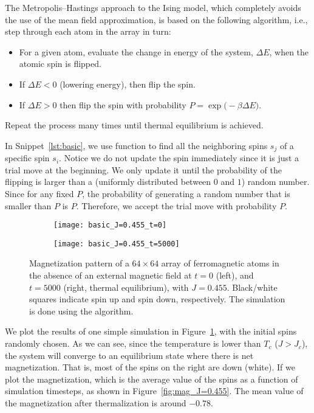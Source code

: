 The Metropolis--Hastings approach to the Ising model, which completely avoids the use of the mean
field approximation, is based on the following algorithm, i.e.,
step through each atom in the array in turn:
%
\begin{itemize}
    \item For a given atom, evaluate the change in energy of the system, \(\Delta E\), when
          the atomic spin is flipped.
    \item If \(\Delta E < 0\) (lowering energy), then flip the spin.
    \item If \(\Delta E > 0\) then flip the spin with probability
          \(P=\exp\bigl(-\beta \Delta E\bigr)\).
\end{itemize}
%
Repeat the process many times until thermal equilibrium is achieved.

In Snippet~\ref{lst:basic}, we use function  to find all the neighboring
spins \(s_j\) of a specific spin \(s_i\). Notice we do not update the spin immediately
since it is just a trial move at the beginning. We only update it until the probability of
the flipping is larger than a (uniformly distributed between \(0\) and \(1\)) random number.
Since for any fixed \(P\), the probability of generating a random number that is smaller
than \(P\) is \(P\). Therefore, we accept the trial move with probability \(P\).

\begin{figure}[H]
    \centering
    \begin{subfigure}{0.49\textwidth}
        \centering
        \texttt{[image: basic\_J=0.455\_t=0]}
    \end{subfigure}
    \hfill
    \begin{subfigure}{0.49\textwidth}
        \centering
        \texttt{[image: basic\_J=0.455\_t=5000]}
    \end{subfigure}
    \caption{Magnetization pattern of a \(64 \times 64\) array of ferromagnetic atoms in the
        absence of an external magnetic field at \(t = 0\) (left), and \(t = 5000\) (right,
        thermal equilibrium), with \(J = 0.455\). Black/white squares indicate spin up and
        spin down, respectively. The simulation is done using the  algorithm.}
    \label{fig:rand_J=0.455}
\end{figure}

We plot the results of one simple simulation in Figure~\ref{fig:rand_J=0.455},
with the initial spins randomly chosen.
As we can see, since the temperature is lower than \(T_c\) (\(J > J_c\)),
the system will converge to an equilibrium state where there is net magnetization.
That is, most of the spins on the right are down (white).
If we plot the magnetization, which is the average value of the spins as a function
of simulation timesteps, as shown in Figure~\ref{fig:mag_J=0.455}.
The mean value of the magnetization after thermalization is around \(-0.78\).

